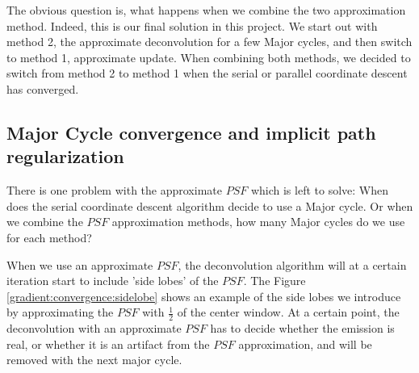 The obvious question is, what happens when we combine the two approximation method. Indeed, this is our final solution in this project. We start out with method 2, the approximate deconvolution for a few Major cycles, and then switch to method 1, approximate update. When combining both methods, we decided to switch from method 2 to method 1 when the serial or parallel coordinate descent has converged.


\subsection{Major Cycle convergence and implicit path regularization}\label{gradients:pathreg}
There is one problem with the approximate $PSF$ which is left to solve: When does the serial coordinate descent algorithm decide to use a Major cycle. Or when we combine the $PSF$ approximation methods, how many Major cycles do we use for each method?

When we use an approximate $PSF$, the deconvolution algorithm will at a certain iteration start to include 'side lobes' of the $PSF$. The Figure \ref{gradient:convergence:sidelobe} shows an example of the side lobes we introduce by approximating the $PSF$ with $\frac{1}{2}$ of the center window. At a certain point, the deconvolution with an approximate $PSF$ has to decide whether the emission is real, or whether it is an artifact from the $PSF$ approximation, and will be removed with the next major cycle.


